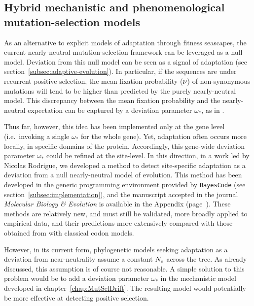 \subsection{Hybrid mechanistic and phenomenological mutation-selection models}
\label{subsec:hybrid-mechanistic-and-phenomenological-mutation-selection-models}

As an alternative to explicit models of adaptation through fitness seascapes, the current nearly-neutral mutation-selection framework can be leveraged as a null model.
Deviation from this null model can be seen as a signal of adaptation (see section~\ref{subsec:adaptive-evolution}).
In particular, if the sequences are under recurrent positive selection, the mean fixation probability ($\nu$) of non-synonymous mutations will tend to be higher than predicted by the purely nearly-neutral model.
This discrepancy between the mean fixation probability and the nearly-neutral expectation can be captured by a deviation parameter $\omega_*$, as in \citet{Rodrigue2016}.

Thus far, however, this idea has been implemented only at the gene level (i.e.~invoking a single $\omega_*$ for the whole gene).
Yet, adaptation often occurs more locally, in specific domains of the protein.
Accordingly, this gene-wide deviation parameter $\omega_*$ could be refined at the site-level.
In this direction, in a work led by Nicolas Rodrigue, we developed a method to detect site-specific adaptation as a deviation from a null nearly-neutral model of evolution.
This method has been developed in the generic programming environment provided by \texttt{BayesCode} (see section~\ref{subsec:implementation}), and the manuscript accepted in the journal \textit{Molecular Biology \& Evolution} is available in the Appendix (page~\pageref{sec-appendix:MutSelM3starMBE}).
These methods are relatively new, and must still be validated, more broadly applied to empirical data, and their predictions more extensively compared with those obtained from with classical codon models.

However, in its current form, phylogenetic models seeking adaptation as a deviation from near-neutrality assume a constant $N_{\text{e}}$ across the tree.
As already discussed, this assumption is of course not reasonable.
A simple solution to this problem would be to add a deviation parameter $\omega_*$ in the mechanistic model developed in chapter~\ref{chap:MutSelDrift}.
The resulting model would potentially be more effective at detecting positive selection.


